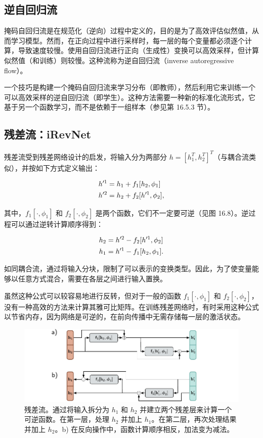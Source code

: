 \documentclass[lang=cn,newtx,10pt,scheme=chinese]{elegantbook}
\begin{document}
\subsection{逆自回归流}
掩码自回归流是在规范化（逆向）过程中定义的，目的是为了高效评估似然值，从而学习模型。然而，在正向过程中进行采样时，每一层的每个变量都必须逐个计算，导致速度较慢。使用自回归流进行正向（生成性）变换可以高效采样，但计算似然值（和训练）则较慢。这种流称为逆自回归流（inverse autoregressive flow）。

一个技巧是构建一个掩码自回归流来学习分布（即教师），然后利用它来训练一个可以高效采样的逆自回归流（即学生）。这种方法需要一种新的标准化流形式，它基于另一个函数学习，而不是依赖于一组样本（参见第 16.5.3 节）。

\subsection{残差流：iRevNet}
残差流受到残差网络设计的启发，将输入分为两部分 \(h = [h^T_1, h^T_2]^T\)（与耦合流类似），并按如下方式定义输出：

\begin{align}
&h'^1 = h_1 + f_1[h_2, \phi_1] \notag \\
&h'^2 = h_2 + f_2[h'^1, \phi_2], 
\end{align} 


其中，\(f_1[\cdot, \phi_1]\) 和 \(f_2[\cdot, \phi_2]\) 是两个函数，它们不一定要可逆（见图 16.8）。逆过程可以通过逆转计算顺序得到：


\begin{align}
&h_2 = h'^2 - f_2[h'^1, \phi_2] \notag \\
&h_1 = h'^1 - f_1[h_2, \phi_1]. 
\end{align} 


如同耦合流，通过将输入分块，限制了可以表示的变换类型。因此，为了使变量能够以任意方式混合，需要在各层之间进行输入置换。

虽然这种公式可以较容易地进行反转，但对于一般的函数 \(f_1[\cdot, \phi_1]\) 和 \(f_2[\cdot, \phi_2]\)，没有一种高效的方法来计算其雅可比矩阵。在训练残差网络时，有时采用这种公式以节省内存，因为网络是可逆的，在前向传播中无需存储每一层的激活状态。

\begin{figure}[ht!]
\centering
\includegraphics[width=0.7\linewidth]{PDFFigures/UDLChap16PDF/FlowResidual.pdf}
\caption{残差流。通过将输入拆分为 \(h_1\) 和 \(h_2\) 并建立两个残差层来计算一个可逆函数。在第一层，处理 \(h_2\) 并加上 \(h_1\)。在第二层，再次处理结果并加上 \(h_2\)。b) 在反向操作中，函数计算顺序相反，加法变为减法。}
\end{figure}
\end{document}
